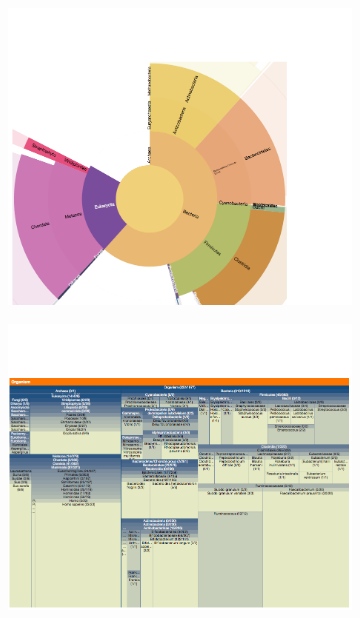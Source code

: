 \begin{figure}
    \centering
    \begin{subfigure}{0.45\textwidth}
        \centering
        \includegraphics[width=\textwidth]{includes/visoverzicht2}
        \caption{}
        \label{fig:overzicht2}
    \end{subfigure}
    \begin{subfigure}{0.45\textwidth}
        \centering
        \includegraphics[width=\textwidth]{includes/visoverzicht3}
        \caption{}
        \label{fig:overzicht3}
    \end{subfigure}
    

\end{figure}
